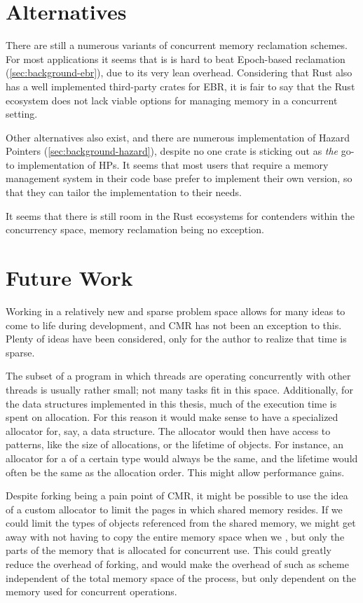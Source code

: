 \section{Alternatives}

There are still a numerous variants of concurrent memory reclamation schemes. For most applications
it seems that is is hard to beat Epoch-based reclamation (\cref{sec:background-ebr}), due to its
very lean overhead. Considering that Rust also has a well implemented third-party crates for EBR,
it is fair to say that the Rust ecosystem does not lack viable options for managing memory in a
concurrent setting.

Other alternatives also exist, and there are numerous implementation of Hazard Pointers
(\cref{sec:background-hazard}), despite no one crate is sticking out as \emph{the} go-to
implementation of HPs. It seems that most users that require a memory management system in their
code base prefer to implement their own version, so that they can tailor the implementation to
their needs.

It seems that there is still room in the Rust ecosystems for contenders within the concurrency
space, memory reclamation being no exception.


\section{Future Work}

Working in a relatively new and sparse problem space allows for many ideas to come to life during
development, and CMR has not been an exception to this. Plenty of ideas have been considered, only
for the author to realize that time is sparse.

The subset of a program in which threads are operating concurrently with other threads is usually
rather small; not many tasks fit in this space. Additionally, for the data structures implemented
in this thesis, much of the execution time is spent on allocation. For this reason it would make
sense to have a specialized allocator for, say, a data structure. The allocator would then have
access to patterns, like the size of allocations, or the lifetime of objects. For instance, an
allocator for a  of a certain type would always be the same, and the lifetime would
often be the same as the allocation order. This might allow performance gains.

Despite forking being a pain point of CMR, it might be possible to use the idea of a custom
allocator to limit the pages in which shared memory resides. If we could limit the types of objects
referenced from the shared memory, we might get away with not having to copy the entire memory
space when we , but only the parts of the memory that is allocated for concurrent use.
This could greatly reduce the overhead of forking, and would make the overhead of such as scheme
independent of the total memory space of the process, but only dependent on the memory used for
concurrent operations.

